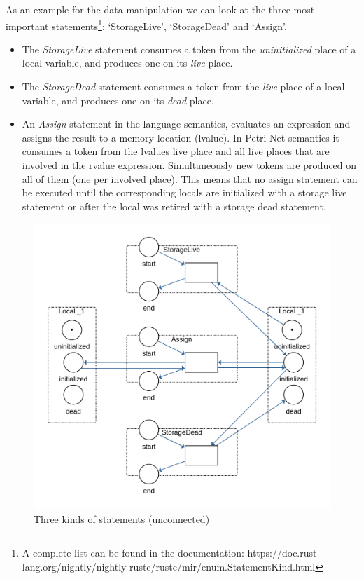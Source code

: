 As an example for the data manipulation we can look at the three most important statements\footnote{A complete list can be found in the documentation:\newline
https://doc.rust-lang.org/nightly/nightly-rustc/rustc/mir/enum.StatementKind.html}: `StorageLive', `StorageDead' and `Assign'.
\begin{itemize}
    \item The \textit{StorageLive} statement consumes a token from the \textit{uninitialized} place of a local variable, and produces one on its \textit{live} place.
    \item The \textit{StorageDead} statement consumes a token from the \textit{live} place of a local variable, and produces one on its \textit{dead} place.
    \item An \textit{Assign} statement in the language semantics, evaluates an expression and assigns the result to a memory location (lvalue).
    In Petri-Net semantics it consumes a token from the lvalues live place and all live places that are involved in the rvalue expression.
    Simultaneously new tokens are produced on all of them (one per involved place).
    This means that no assign statement can be executed until the corresponding locals are initialized with a storage live statement or after the local was retired with a storage dead statement.
\end{itemize}

\begin{figure}
    \centering
    \includegraphics[width=.6\textwidth]{../diagrams/StatementsNet.png}
    \caption{Three kinds of statements (unconnected)}
    \label{statements_net}
\end{figure}


